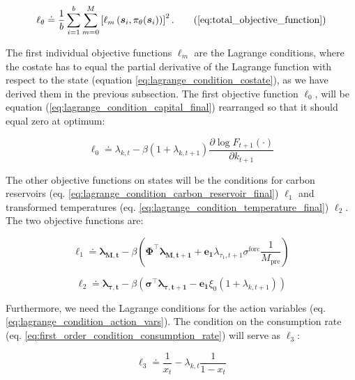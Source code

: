 \begin{equation}
    \ell_{\theta} \doteq \frac{1}{b} \sum_{i=1}^b \sum_{m=0}^M \left[ \ell_{m} \left(\bm{s}_i, \pi_\theta(\bm{s}_i)  \right) \right]^2 .
\tag{\ref{eq:total_objective_function}}
\end{equation}

The first individual objective functions \(\ell_m\) are the Lagrange conditions, where the costate has to equal the partial derivative of the Lagrange function with respect to the state (equation \ref{eq:lagrange_condition_costate}), as we have derived them in the previous subsection. The first objective function \(\ell_0\), will be equation (\ref{eq:lagrange_condition_capital_final}) rearranged so that it should equal zero at optimum:

\begin{equation}
    \ell_0 \doteq \lambda_{k,t} - \beta (1 + \lambda_{k,t+1}) \frac{\partial \log F_{t+1}(\cdot)}{\partial k_{t+1}}
\label{eq:general_objective_0}
\end{equation}

The other objective functions on states will be the conditions for carbon reservoirs (eq. \ref{eq:lagrange_condition_carbon_reservoir_final}) \(\ell_1\) and transformed temperatures (eq. \ref{eq:lagrange_condition_temperature_final}) \(\ell_2\). The two objective functions are:

\begin{equation}
    \ell_1 \doteq
        \bm{\lambda_{M,t}} - \beta \left( 
        \bm{\Phi}^\top \bm{\lambda_{M,t+1}}
        + \bm{e_1} \lambda_{\tau_1,t+1} \sigma^{\text{forc}}\frac{1}{M_{\text{pre}}} 
    \right)
\label{eq:general_objective_1}
\end{equation}

\begin{equation}
    \ell_2 \doteq
        \bm{\lambda_{\tau, t}} - \beta \left( 
            \bm{\sigma}^\top\bm{\lambda_{\tau, t+1}} - \bm{e_1}\xi_0(1 + \lambda_{k,t+1})
        \right)
\label{eq:general_objective_2}
\end{equation}

Furthermore, we need the Lagrange conditions for the action variables (eq. \ref{eq:lagrange_condition_action_vars}). The condition on the consumption rate (eq. \ref{eq:first_order_condition_consumption_rate}) will serve as \(\ell_3\):

\begin{equation}
    \ell_3 \doteq \frac{1}{x_t} 
        - \lambda_{k,t}\frac{1}{1-x_t}
\label{eq:general_objective_3}
\end{equation}

